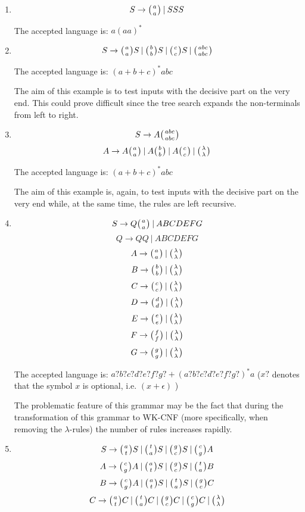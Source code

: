 \begin{enumerate}
  \item{
    $$S \rightarrow \wkpair{a}{a} \:|\: S S S$$

    The accepted language is: $a(aa)^*$
  }

  \item{
    $$S \rightarrow \wkpair{a}{a} S \:|\: \wkpair{b}{b} S \:|\: \wkpair{c}{c} S \:|\: \wkpair{abc}{abc}$$

    The accepted language is: $(a+b+c)^*abc$

    The aim of this example is to test inputs with the decisive part on the very end. This could prove difficult  since the tree search expands the non-terminals from left to right.
  }

  \item{
    $$S \rightarrow A \wkpair{abc}{abc}$$
    $$A \rightarrow A \wkpair{a}{a} \:|\: A \wkpair{b}{b} \:|\: A \wkpair{c}{c} \:|\: \wkpair{\lambda}{\lambda}$$

    The accepted language is: $(a+b+c)^*abc$

    The aim of this example is, again, to test inputs with the decisive part on the very end while, at the same time, the rules are left recursive.
  }

  \item{
    $$S \rightarrow Q \wkpair{a}{a} \:|\: A B C D E F G$$
    $$Q \rightarrow Q Q \:|\: A B C D E F G$$
    $$A \rightarrow \wkpair{a}{a} \:|\: \wkpair{\lambda}{\lambda}$$
    $$B \rightarrow \wkpair{b}{b} \:|\: \wkpair{\lambda}{\lambda}$$
    $$C \rightarrow \wkpair{c}{c} \:|\: \wkpair{\lambda}{\lambda}$$
    $$D \rightarrow \wkpair{d}{d} \:|\: \wkpair{\lambda}{\lambda}$$
    $$E \rightarrow \wkpair{e}{e} \:|\: \wkpair{\lambda}{\lambda}$$
    $$F \rightarrow \wkpair{f}{f} \:|\: \wkpair{\lambda}{\lambda}$$
    $$G \rightarrow \wkpair{g}{g} \:|\: \wkpair{\lambda}{\lambda}$$

    The accepted language is: $a?b?c?d?e?f?g? + (a?b?c?d?e?f?g?)^*a$ ($x?$ denotes that the symbol $x$ is optional, i.e. $(x + \epsilon)$ )

    The problematic feature of this grammar may be the fact that during the transformation of this grammar to WK-CNF (more specifically, when removing the $\lambda$-rules) the number of rules increases rapidly.
  }

  \item{
    $$S \rightarrow \wkpair{a}{t} S \:|\: \wkpair{t}{a} S \:|\: \wkpair{g}{c} S \:|\: \wkpair{c}{g} A$$
    $$A \rightarrow \wkpair{c}{g} A \:|\: \wkpair{a}{t} S \:|\: \wkpair{g}{c} S \:|\: \wkpair{t}{a} B$$
    $$B \rightarrow \wkpair{c}{g} A \:|\: \wkpair{a}{t} S \:|\: \wkpair{t}{a} S \:|\: \wkpair{g}{c} C$$
    $$C \rightarrow \wkpair{a}{t} C \:|\: \wkpair{t}{a} C \:|\: \wkpair{g}{c} C \:|\: \wkpair{c}{g} C \:|\: \wkpair{\lambda}{\lambda}$$

}
\end{enumerate}
